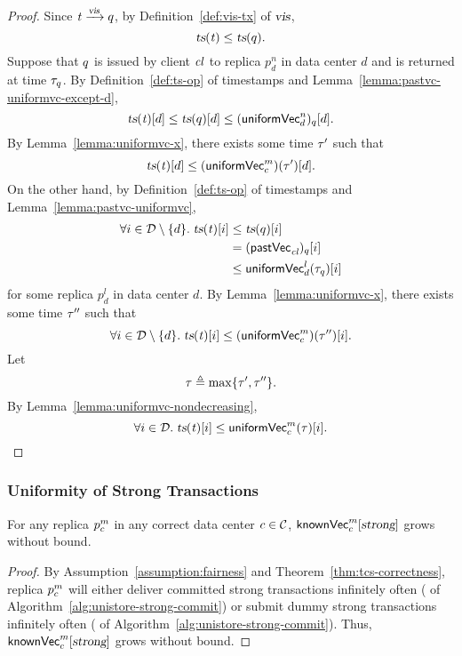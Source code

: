 \begin{proof} \label{proof:uniformity-causal-fence}
  Since $\mathit{t} \xrightarrow{\textsl{vis}} q$, by Definition~\ref{def:vis-tx} of $\textsl{vis}$,
  \[
    \textsl{ts}(\mathit{t}) \le \textsl{ts}(q).
  \]
  Suppose that $q$ is issued by client $\mathit{cl}$
  to replica $p^{n}_{d}$ in data center $d$
  and is returned at time $\tau_{q}$.
  By Definition~\ref{def:ts-op} of timestamps
  and Lemma~\ref{lemma:pastvc-uniformvc-except-d},
  \[
    \textsl{ts}(\mathit{t})[d] \le \textsl{ts}(q)[d] \le ({\sf uniformVec}^{n}_{d})_{q}[d].
  \]
  By Lemma~\ref{lemma:uniformvc-x},
  there exists some time $\tau'$ such that
  \[
    \textsl{ts}(\mathit{t})[d] \le ({\sf uniformVec}^{m}_{c})(\tau')[d].
  \]
  On the other hand, by Definition~\ref{def:ts-op} of timestamps
  and Lemma~\ref{lemma:pastvc-uniformvc},
  \begin{align*}
    \forall i \in \mathcal{D} \setminus \{d\}.\;
      \textsl{ts}(\mathit{t})[i] &\le \textsl{ts}(q)[i] \\
      &= ({\sf pastVec}_{\mathit{cl}})_{q}[i] \\
      &\le {\sf uniformVec}^{l}_{d}(\tau_{q})[i]
  \end{align*}
  for some replica $p^{l}_{d}$ in data center $d$.
  By Lemma~\ref{lemma:uniformvc-x},
  there exists some time $\tau''$ such that
  \[
    \forall i \in \mathcal{D} \setminus \{d\}.\;
      \textsl{ts}(\mathit{t})[i] \le ({\sf uniformVec}^{m}_{c})(\tau'')[i].
  \]
  Let
  \[
    \tau \triangleq \max\{\tau', \tau''\}.
  \]
  By Lemma~\ref{lemma:uniformvc-nondecreasing},
  \[
    \forall i \in \mathcal{D}.\; \textsl{ts}(\mathit{t})[i] \le {\sf uniformVec}^{m}_{c}(\tau)[i].
  \]
\end{proof}
\subsubsection{Uniformity of Strong Transactions}
\label{sss:uniformity-strong}

\begin{applemma} \label{lemma:knownvc-strong-no-bound}
  For any replica $p^{m}_{c}$
  in any correct data center $c \in \mathcal{C}$,
  ${\sf knownVec}^{m}_{c}[\textsl{strong}]$ grows without bound.
\end{applemma}

\begin{proof} \label{proof:knownvc-strong-no-bound}
  By Assumption~\ref{assumption:fairness}
  and Theorem~\ref{thm:tcs-correctness},
  replica $p^{m}_{c}$ will either deliver committed strong transactions
  infinitely often (\deliver{} of Algorithm~\ref{alg:unistore-strong-commit})
  or submit dummy strong transactions infinitely often
  (\heartbeatstrong{} of Algorithm~\ref{alg:unistore-strong-commit}).
  Thus, ${\sf knownVec}^{m}_{c}[\textsl{strong}]$ grows without bound.
\end{proof}

